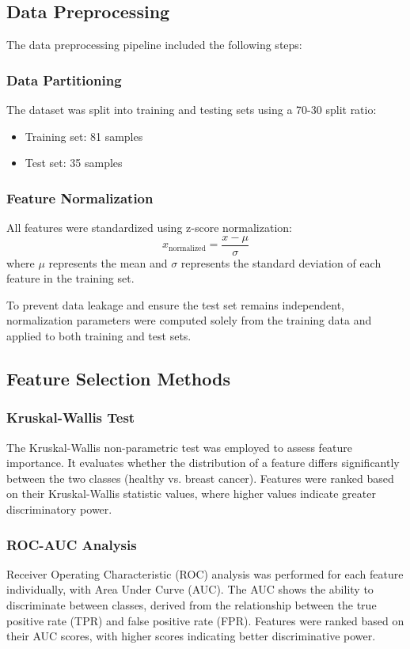 \documentclass[12pt,a4paper]{article}
\begin{document}
\subsection{Data Preprocessing}
\label{subsec:preprocessing}

The data preprocessing pipeline included the following steps:

\subsubsection{Data Partitioning}
The dataset was split into training and testing sets using a 70-30 split ratio:
\begin{itemize}
    \item Training set: 81 samples
    \item Test set: 35 samples
\end{itemize}

\subsubsection{Feature Normalization}
All features were standardized using z-score normalization:
\[
x_{\text{normalized}} = \frac{x - \mu}{\sigma}
\]
where $\mu$ represents the mean and $\sigma$ represents the standard deviation of each feature in the training set.

To prevent data leakage and ensure the test set remains independent, normalization parameters were computed solely from the training data and applied to both training and test sets.

\subsection{Feature Selection Methods}
\label{subsec:feature_selection}

\subsubsection{Kruskal-Wallis Test}
The Kruskal-Wallis non-parametric test was employed to assess feature importance. It evaluates whether the distribution of a feature differs significantly between the two classes (healthy vs. breast cancer). Features were ranked based on their Kruskal-Wallis statistic values, where higher values indicate greater discriminatory power. 


\subsubsection{ROC-AUC Analysis}
Receiver Operating Characteristic (ROC) analysis was performed for each feature individually, with Area Under Curve (AUC). The AUC shows the ability to discriminate between classes, derived from the relationship between the true positive rate (TPR) and false positive rate (FPR).
Features were ranked based on their AUC scores, with higher scores indicating better discriminative power.
\end{document}
